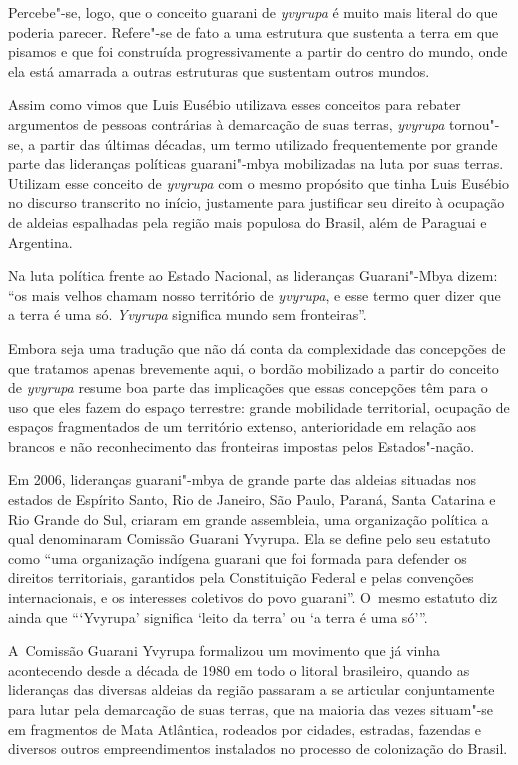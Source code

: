 Percebe"-se, logo, que o conceito guarani de \emph{yvyrupa} é muito mais literal
do que poderia parecer. Refere"-se de fato a uma estrutura que sustenta
a terra em que pisamos e que foi construída progressivamente a partir
do centro do mundo, onde ela está amarrada a outras estruturas que
sustentam outros mundos.

Assim como vimos que Luis Eusébio utilizava esses conceitos para rebater
argumentos de pessoas contrárias à demarcação de suas terras, \emph{yvyrupa}
tornou"-se, a partir das últimas décadas, um termo utilizado
frequentemente por grande parte das lideranças políticas guarani"-mbya
mobilizadas na luta por suas terras. Utilizam esse conceito de \emph{yvyrupa}
com o mesmo propósito que tinha Luis Eusébio no discurso transcrito no 
início, justamente para justificar seu direito à ocupação de
aldeias espalhadas pela região mais populosa do Brasil, além de
Paraguai e Argentina.

Na luta política frente ao Estado Nacional, as lideranças Guarani"-Mbya
dizem: ``os mais velhos chamam nosso território de \emph{yvyrupa}, e esse termo
quer dizer que a terra é uma só. \emph{Yvyrupa} significa mundo sem
fronteiras''.

Embora seja uma tradução que não dá conta da complexidade das concepções
de que tratamos apenas brevemente aqui, o bordão mobilizado a partir do
conceito de \emph{yvyrupa} resume boa parte das implicações que essas
concepções têm para o uso que eles fazem do espaço terrestre: grande
mobilidade territorial, ocupação de espaços fragmentados de um
território extenso, anterioridade em relação aos brancos e não
reconhecimento das fronteiras impostas pelos Estados"-nação.

Em 2006, lideranças guarani"-mbya de grande parte das aldeias situadas
nos estados de Espírito Santo, Rio de Janeiro, São Paulo, Paraná, Santa
Catarina e Rio Grande do Sul, criaram em grande assembleia, uma
organização política a qual denominaram Comissão Guarani Yvyrupa. Ela
se define pelo seu estatuto como ``uma organização indígena guarani que
foi formada para defender os direitos territoriais, garantidos pela
Constituição Federal e pelas convenções internacionais, e os interesses
coletivos do povo guarani''. O~mesmo estatuto diz ainda que ``‘Yvyrupa’ 
significa ‘leito da terra’ ou ‘a terra é uma só’''.

A~Comissão Guarani Yvyrupa formalizou um movimento que já vinha
acontecendo desde a década de 1980 em todo o litoral brasileiro,
quando as lideranças das diversas aldeias da região passaram a se
articular conjuntamente para lutar pela demarcação de suas terras, que
na maioria das vezes situam"-se em fragmentos de Mata Atlântica,
rodeados por cidades, estradas, fazendas e diversos outros
empreendimentos instalados no processo de colonização do Brasil.


